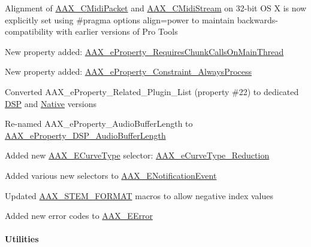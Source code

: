 \begin{DoxyItemize}
\item Alignment of \mbox{\hyperlink{a01429}{A\+A\+X\+\_\+\+C\+Midi\+Packet}} and \mbox{\hyperlink{a01433}{A\+A\+X\+\_\+\+C\+Midi\+Stream}} on 32-\/bit OS X is now explicitly set using {\ttfamily \#pragma options align=power} to maintain backwards-\/compatibility with earlier versions of Pro Tools 
\item New property added\+: \mbox{\hyperlink{a00662_a13e384f22825afd3db6d68395b79ce0da01bd38243e95666d55b80e79bc13c5cb}{A\+A\+X\+\_\+e\+Property\+\_\+\+Requires\+Chunk\+Calls\+On\+Main\+Thread}}  
\item New property added\+: \mbox{\hyperlink{a00662_a13e384f22825afd3db6d68395b79ce0da510e79713c2f14ebb0a50ed2ab0ff679}{A\+A\+X\+\_\+e\+Property\+\_\+\+Constraint\+\_\+\+Always\+Process}}  
\item Converted {\ttfamily A\+A\+X\+\_\+e\+Property\+\_\+\+Related\+\_\+\+Plugin\+\_\+\+List} (property \#22) to dedicated \mbox{\hyperlink{a00662_a13e384f22825afd3db6d68395b79ce0da9dc35184d705e963f14f85df4d71193d}{D\+SP}} and \mbox{\hyperlink{a00662_a13e384f22825afd3db6d68395b79ce0dae47f50370ae2f6bf29b8cacc6a41d924}{Native}} versions 
\item Re-\/named A\+A\+X\+\_\+e\+Property\+\_\+\+Audio\+Buffer\+Length to \mbox{\hyperlink{a00662_a13e384f22825afd3db6d68395b79ce0da09fbd1cbcae0e86ad81005258dc1b67e}{A\+A\+X\+\_\+e\+Property\+\_\+\+D\+S\+P\+\_\+\+Audio\+Buffer\+Length}} 
\item Added new \mbox{\hyperlink{a00812_ga59c73d8f51c5c55d54a728eff39da884}{A\+A\+X\+\_\+\+E\+Curve\+Type}} selector\+: \mbox{\hyperlink{a00812_gga59c73d8f51c5c55d54a728eff39da884a011b1b00d6189a8903735dcae2f8bc93}{A\+A\+X\+\_\+e\+Curve\+Type\+\_\+\+Reduction}}  
\item Added various new selectors to \mbox{\hyperlink{a00491_afab5ea2cfd731fc8f163b6caa685406e}{A\+A\+X\+\_\+\+E\+Notification\+Event}}  
\item Updated \mbox{\hyperlink{a00491_a49ce720dc4840f983ca0f3d4d1fd2e9a}{A\+A\+X\+\_\+\+S\+T\+E\+M\+\_\+\+F\+O\+R\+M\+AT}} macros to allow negative index values  
\item Added new error codes to \mbox{\hyperlink{a00494_a5f8c7439f3a706c4f8315a9609811937}{A\+A\+X\+\_\+\+E\+Error}} 
\end{DoxyItemize}\hypertarget{a00847_aax_sdk_2p1p0_Utilities}{}\paragraph{Utilities}\label{a00847_aax_sdk_2p1p0_Utilities}

